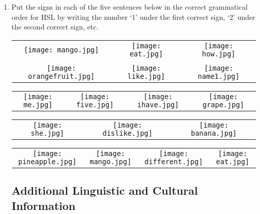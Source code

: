 \documentclass{tufte-book}
\begin{document}
\begin{enumerate}
\begin{table*}[h!]
\begin{tabular}{c c}
\end{tabular}
\end{table*}
\item Put the signs in each of the five sentences below in the correct grammatical order for HSL by writing the number `1' under the first correct sign, `2' under the second correct sign, etc.

 \begin{table*}[h!]
\begin{tabular}{c c c}
\texttt{[image: mango.jpg]} & \texttt{[image: eat.jpg]}&
\texttt{[image: how.jpg]}\\
& & \\
\texttt{[image: orangefruit.jpg]} & \texttt{[image: like.jpg]}&
\texttt{[image: name1.jpg]}\\
\end{tabular}
\end{table*}

 \begin{table*}[h!]
\begin{tabular}{c c c c}
\texttt{[image: me.jpg]} & \texttt{[image: five.jpg]}&
\texttt{[image: ihave.jpg]}&
\texttt{[image: grape.jpg]}\\
\end{tabular}
\end{table*}
\newpage

 \begin{table*}[h!]
\begin{tabular}{c c c}
\texttt{[image: she.jpg]} & \texttt{[image: dislike.jpg]}&
\texttt{[image: banana.jpg]}\\
\end{tabular}
\end{table*}

 \begin{table*}[h!]
\begin{tabular}{c c c c}
\texttt{[image: pineapple.jpg]} & \texttt{[image: mango.jpg]}&
\texttt{[image: different.jpg]}&
\texttt{[image: eat.jpg]}\\
\end{tabular}
\end{table*}

\vspace{3cm}
\subsection{Additional Linguistic and Cultural Information}


\end{enumerate}
\end{document}
